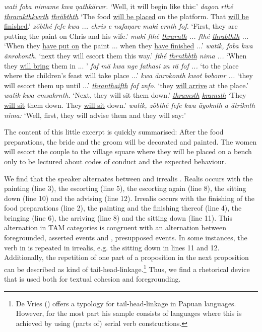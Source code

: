 \begin{exe}
\ex
\begin{xlist}
	 \emph{wati foba nimame kwa ŋathkärwr.}
	\trans `Well, it will begin like this:'
	 \emph{dagon rthé \uline{thrarakthkwrth} \uline{thräbthth}}
	\trans `The food \uline{will be placed} on the platform. That \uline{will be finished}.'
	 \emph{zöbthé fefe kwa ... chris e nafaŋare maki ernth fof.}
	\trans `First, they are putting the paint on Chris and his wife.'
	 \emph{maki fthé \uline{thrarnth} ... fthé \uline{thrabthth} ...}
	\trans `When they \uline{have put on} the paint ... when they \uline{have finished} ...'
	 \emph{watik, foba kwa änrokonth.}
	\trans `next they will escort them this way.'
	 \emph{fthé \uline{thrnthbth} nima ...}
	\trans `When they \uline{will bring} them in ... '
	 \emph{faf mä kwa nge fathasi zn rä fof ...}
	\trans `to the place where the children's feast will take place ...'
	 \emph{kwa änrokonth kwot bobomr ...}
	\trans `they will escort them up until ...'
	 \emph{\uline{thranthaifth} faf znfo.}
	\trans `they \uline{will arrive} at the place.'
	 \emph{watik kwa emsakrnth.}
	\trans `Next, they will sit them down.'
	 \emph{\uline{thramsth} \uline{kramsth}}
	\trans `They \uline{will sit} them down. They \uline{will sit} down.'
	 \emph{watik, zöbthé fefe kwa äyoknth a ätriknth nima:}
	\trans `Well, first, they will advise them and they will say:'
\end{xlist}
\label{fathasitext}
\end{exe}

The content of this little excerpt is quickly summarised: After the food preparations, the bride and the groom will be decorated and painted. The women will escort the couple to the village square where they will be placed on a bench only to be lectured about codes of conduct and the expected behaviour.

We find that the speaker alternates between  and irrealis . Realis occurs with the painting (line 3), the escorting (line 5), the escorting again (line 8), the sitting down (line 10) and the advising (line 12). Irrealis occurs with the finishing of the food preparations (line 2), the painting and the finishing thereof (line 4), the bringing (line 6), the arriving (line 8) and the sitting down (line 11). This alternation in TAM categories is congruent with an alternation between foregrounded, asserted events and , presupposed events. In some instances, the verb in  is repeated in irrealis, e.g. the sitting down in lines 11 and 12. Additionally, the repetition of one part of a proposition in the next proposition can be described as kind of tail-head-linkage.\footnote{De Vries (\citeyear{deVries:2005tm}) offers a typology for tail-head-linkage in Papuan languages. However, for the most part his sample consists of languages where this is achieved by using (parts of) serial verb constructions.} Thus, we find a rhetorical device that is used both for textual cohesion and foregrounding.

